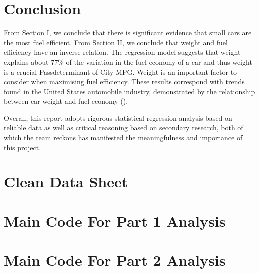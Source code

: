 \documentclass[12pt]{article}
\begin{document}
\section{Conclusion}
From Section I, we conclude that there is significant evidence that small cars are the most fuel efficient. 
From Section II, we conclude that weight and fuel efficiency have an inverse relation. The regression model suggests that weight explains about 77\% of the variation in the fuel economy of a car and thus weight is a crucial Passdeterminant of City MPG. Weight is an important factor to consider when maximising fuel efficiency. These results correspond with trends found in the United States automobile industry, demonstrated by the relationship between car weight and fuel economy (\cite{IWU}).



Overall, this report adopts rigorous statistical regression analysis based on reliable data as well as critical reasoning based on secondary research, both of which the team reckons has manifested the meaningfulness and importance of this project.
\newpage

\begin{appendices}
\section{Clean Data Sheet} \label{app:CLData}
\label{Tab:CLData}
\section{Main Code For Part 1 Analysis} \label{app:Part1Code}

\break
\break 
\break
\section{Main Code For Part 2 Analysis} \label{app:Part2Code}

\end{appendices}
\end{document}
